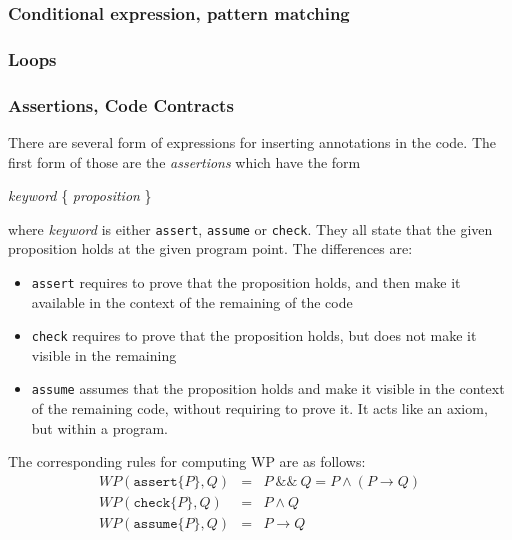 
\subsubsection{Conditional expression, pattern matching}


\subsubsection{Loops}


\subsubsection{Assertions, Code Contracts}

There are several form of expressions for inserting annotations in the code.
The first form of those are the \emph{assertions} which have the form
\begin{flushleft}\ttfamily
  \textsl{keyword} \{ \textsl{proposition} \}
\end{flushleft}
where \textsl{keyword} is either \texttt{assert}, \texttt{assume} or
\texttt{check}. They all state that the given proposition holds at the given program point. The differences are:
\begin{itemize}
\item \texttt{assert} requires to prove that the proposition holds, and then make it available in the context of the remaining of the code
\item \texttt{check} requires to prove that the proposition holds, but
  does not make it visible in the remaining
\item \texttt{assume} assumes that the proposition holds and make it
  visible in the context of the remaining code, without requiring to
  prove it. It acts like an axiom, but within a program.
\end{itemize}
The corresponding rules for computing WP are as follows:
\begin{eqnarray*}
  WP(\texttt{assert} \{ P \}, Q) &=& P \mathop{\&\&} Q = P \land (P \rightarrow Q)\\
  WP(\texttt{check} \{ P \}, Q) &=& P \land Q \\
  WP(\texttt{assume} \{ P \}, Q) &=& P \rightarrow Q
\end{eqnarray*}


